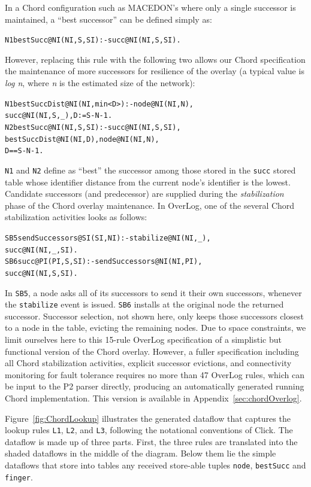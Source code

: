 \documentclass{sig-alt-full}
\def\Sys{P2\xspace}
\def\Lang{OverLog\xspace}
\def\PChordLines{47\xspace}
\newcommand{\ol}[1]{{\tt\footnotesize#1}}
\newenvironment{overlog}{\begin{alltt}\small}{\end{alltt}}
\begin{document}
In a Chord configuration such as MACEDON's where only a single successor is
maintained, a ``best successor'' can be defined simply as:
\begin{overlog}
N1 bestSucc@NI(NI,S,SI) :- succ@NI(NI,S,SI).
\end{overlog}
However, replacing this rule with the following two allows our Chord
specification the maintenance of more successors
for resilience of the overlay (a typical value is \textit{log n},
where \textit{n} is the estimated size of the network):
\begin{overlog}
N1 bestSuccDist@NI(NI,min<D>) :- node@NI(NI,N),
  succ@NI(NI,S,_), D := S - N - 1.
N2 bestSucc@NI(NI,S,SI) :- succ@NI(NI,S,SI),
  bestSuccDist@NI(NI,D), node@NI(NI,N),
  D == S - N - 1.
\end{overlog}
\ol{N1} and \ol{N2} define as ``best'' the successor among those
stored in the \ol{succ} stored table whose identifier distance from the
current node's identifier is the lowest.  Candidate successors (and
predecessor) are supplied during the \emph{stabilization} phase of the
Chord overlay maintenance.  In \Lang, one of the several Chord stabilization
activities looks as follows:
\begin{overlog}
SB5 sendSuccessors@SI(SI,NI) :- stabilize@NI(NI,_),
  succ@NI(NI,_,SI).
SB6 succ@PI(PI,S,SI) :- sendSuccessors@NI(NI,PI),
  succ@NI(NI,S,SI).
\end{overlog}
In \ol{SB5}, a node asks all of its successors to send it their own
successors, whenever the \ol{stabilize} event is
issued. \ol{SB6} installs at the original node the
returned successor. Successor selection, not shown
here, only keeps those successors closest to a node
in the table, evicting the remaining nodes.
Due to space constraints, we limit ourselves here to this
15-rule \Lang
specification of a simplistic but functional version of the Chord
overlay.  However, a fuller specification including all Chord
stabilization activities, explicit successor evictions, and connectivity monitoring for
fault tolerance requires no more than \PChordLines \Lang rules, which can be
input to the \Sys parser directly, producing an automatically generated
running Chord implementation.  This version is available in Appendix~\ref{sec:chordOverlog}.

Figure~\ref{fig:ChordLookup} illustrates the generated dataflow that
captures the lookup rules \ol{L1}, \ol{L2}, and \ol{L3}, following
the notational conventions of Click.  The dataflow is made up of three
parts.  First, the three rules are translated into the shaded dataflows
in the middle of the diagram. Below them lie the simple dataflows that
store into tables any received store-able tuples \ol{node}, \ol{bestSucc} and \ol{finger}.
\end{document}
